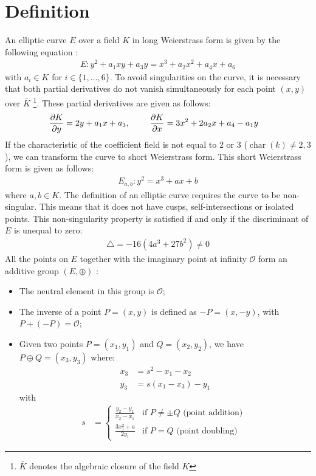 \section{Definition}
An elliptic curve $E$ over a field $K$ in long Weierstrass form is given by the following equation \cite{peter2008elliptic}:
%
\begin{align*}
E: y^2 + a_1 xy + a_3y = x^3 + a_2 x^2 + a_4x + a_6
\end{align*}
%
with $a_i \in K$ for $i \in \{1,\ldots,6\}$.
To avoid singularities on the curve, it is necessary that both partial derivatives do not vanish simultaneously for each point $(x,y)$ over $\bar{K}$%
\footnote{$\bar{K}$ denotes the algebraic closure of the field $K$}.
%
These partial derivatives are given as follows:
%
\begin{align*}
\pdv{K}{y} &= 2y + a_1 x + a_3, ~~~~~~~ \pdv{K}{x} = 3x^2 + 2a_2x + a_4 - a_1 y
\end{align*}
%
If the characteristic of the coefficient field is not equal to 2 or 3 ($\operatorname{char}(k) \neq 2,3$), we can transform the curve to short Weierstrass form. This short Weierstrass form is given as follows:
%
\begin{align*}
E_{a, b}: y^2 = x^3 + ax + b
\end{align*}
%
where $a,b \in K$. 
The definition of an elliptic curve requires the curve to be non-singular. 
This means that it does not have cusps, self-intersections or isolated points. 
This non-singularity property is satisfied if and only if the discriminant of $E$ is unequal to zero:
%
\begin{align*}
\triangle = -16(4a^3 + 27b^2) \neq 0
\end{align*}
%
All the points on $E$ together with the imaginary point at infinity $\mathcal{O}$ form an additive group $(E, \oplus)$ \cite{peter2008elliptic}:
%
\begin{itemize}
	\item The neutral element in this group is $\mathcal{O}$;
	\item The inverse of a point $P=(x,y)$ is defined as $-P = (x, -y)$, with $P + (-P) = \mathcal{O}$;
	\item Given two points $P=(x_1, y_1)$ and $Q = (x_2, y_2)$, we have $P \oplus Q = (x_3, y_3)$ where:
	\begin{align*}
	x_3 &= s^2 - x_1 - x_2 \\
	y_3 &= s(x_1 - x_3) - y_1
	\end{align*}
	with
	\begin{align*}
	s &= 	\begin{cases}
				\frac{y_2 - y_1}{x_2 - x_1} 	& \text{if $P \neq \pm Q$ (point addition) }\\
				\frac{3 x_1^2 + a}{2y_1}		& \text{if $P = Q$ (point doubling)}
			\end{cases}	
	\end{align*}
\end{itemize}
